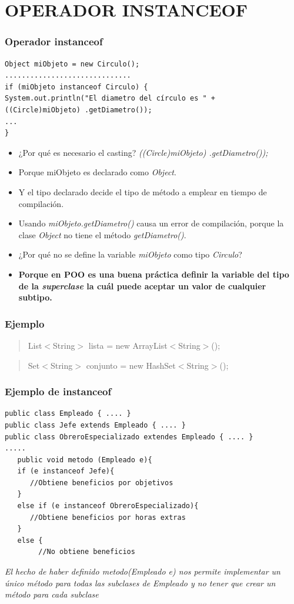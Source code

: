 \documentclass{beamer}
\begin{document}
\section{OPERADOR INSTANCEOF}
\begin{frame}[fragile]
\frametitle{Operador instanceof}
\begin{verbatim}
Object miObjeto = new Circulo();
..............................
if (miObjeto instanceof Circulo) {
System.out.println("El diametro del círculo es " +
((Circle)miObjeto) .getDiametro());
...
}
\end{verbatim}
\begin{footnotesize}
\begin{itemize}[<+->]
\item ¿Por qué es necesario el casting? \emph{((Circle)miObjeto) .getDiametro());}
\item Porque miObjeto es declarado como \emph{Object}.
\item Y el tipo declarado decide el tipo de método a emplear en tiempo de compilación.
\item Usando \emph{miObjeto.getDiametro()} causa un error de compilación, porque la clase \emph{Object} no tiene el método \emph{getDiametro()}.
\item ¿Por qué no se define la variable \emph{miObjeto} como tipo \emph{Circulo}?
\item \textbf{Porque en POO es una buena práctica definir la variable del tipo de la \emph{superclase} la cuál puede aceptar un valor de cualquier subtipo.}
\end{itemize}
\end{footnotesize}
\end{frame}

\begin{frame}
\frametitle{Ejemplo}
\begin{quote}
List$<$String$>$ lista = new ArrayList$<$String$>$();
\end{quote}
\pause
\begin{quote}
Set$<$String$>$ conjunto = new HashSet$<$String$>$();
\end{quote}
\end{frame}


\begin{frame}[fragile]
\frametitle{Ejemplo de instanceof}
\begin{verbatim}
public class Empleado { .... }
public class Jefe extends Empleado { .... }
public class ObreroEspecializado extendes Empleado { .... }
.....
   public void metodo (Empleado e){
   if (e instanceof Jefe){
      //Obtiene beneficios por objetivos
   }
   else if (e instanceof ObreroEspecializado){
      //Obtiene beneficios por horas extras
   }
   else {
   		//No obtiene beneficios
\end{verbatim}
\emph{El hecho de haber definido \emph{metodo(Empleado e)} nos permite implementar un único método para todas las subclases de \emph{Empleado} y no tener que crear un método para cada subclase}
\end{frame}
\end{document}
